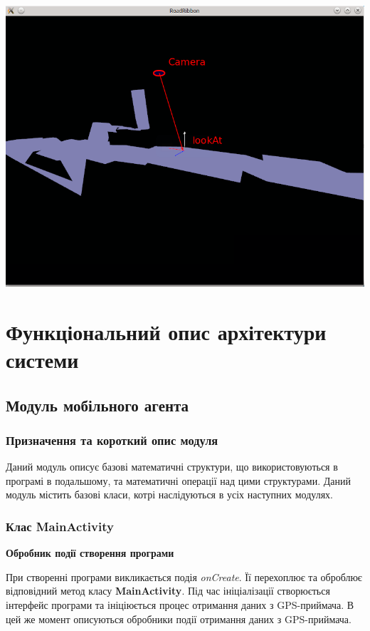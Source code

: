 \documentclass[simple,a4paper,14pt,ukrainian,utf8]{eskdtext}
\begin{document}
		\vspace{3em}
		\includegraphics[scale=0.5]{images/camera2.png}
       
\newpage \section{Функціональний опис архітектури системи}

    \subsection{Модуль мобільного агента}

        \subsubsection{Призначення та короткий опис модуля}

            Даний модуль описує базові математичні структури, що використовуються в програмі в подальшому, та математичні операції над цими структурами. Даний модуль містить базові класи, котрі наслідуються в усіх наступних модулях.

        \subsubsection{Клас MainActivity}
        
        	\textbf{Обробник події створення програми}
        	
        	При створенні програми викликається подія \textit{onCreate}. Її перехоплює та оброблює відповідний метод класу \textbf{MainActivity}. Під час ініціалізації створюється інтерфейс програми та ініціюється процес отримання даних з GPS-приймача. В цей же момент описуються обробники події отримання даних з GPS-приймача.
        	
\end{document}
